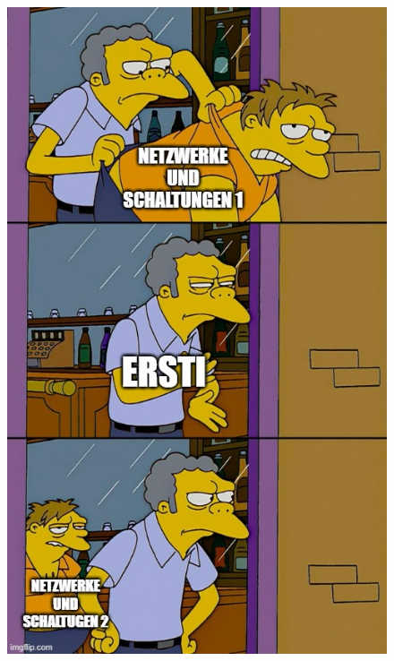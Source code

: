 \documentclass[11pt,a4paper]{article}
\begin{document}
\begin{figure}[h]
\begin{minipage}{0.3\textwidth}
        \includegraphics[width=\textwidth]{memes/meme2.jpg}
    \end{minipage}
    \begin{minipage}{0.3\textwidth}
        \centering

\end{minipage}
\end{figure}
\end{document}
